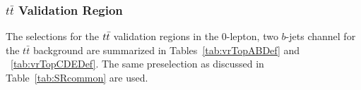%
%    
%    
%    


%
\subsubsection{\boldmath$t\bar{t}$ Validation Region}


The selections for the $t\bar{t}$ validation regions in the 0-lepton, two $b$-jets channel for the $t\bar{t}$ background are summarized in Tables~\ref{tab:vrTopABDef} and ~\ref{tab:vrTopCDEDef}. The same preselection as discussed in Table~\ref{tab:SRcommon} are used.

